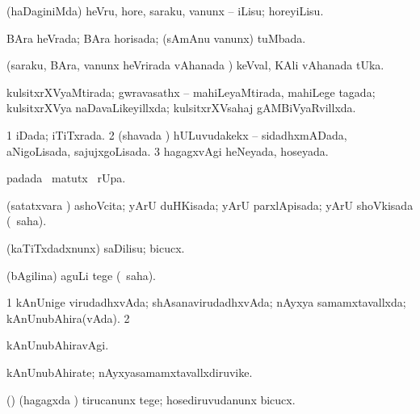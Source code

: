 {{\bentry
{} 
\gl{\sakirx}
\expl{}
\bmng
(haDaginiMda) heVru, hore, saraku, \mo vanunx -- iLisu; horeyiLisu. 
\emng
\eentry

\bentry
{} 
\gl{\gu}
\expl{}
\bmng
BAra heVrada; BAra horisada; (sAmAnu \mo vanunx) tuMbada. 
\emng

\noindent
\gl{\pagu}
\expl{}
\bmng
{} (saraku, BAra, \mo vanunx heVrirada vAhanada \vi) keVval, KAli vAhanada tUka. 
\emng
\eentry

\bentry
{} 
\gl{\gu}
\expl{}
\bmng
kulsitxrXVyaMtirada; gwravasathx -- mahiLeyaMtirada, mahiLege tagada; kulsitxrXVya naDavaLikeyillxda; kulsitxrXVsahaj gAMBiVyaRvillxda. 
\emng
\eentry

\bentry
{} 
\gl{\gu}
\expl{}
\bmng
\bnum
\num{1} iDada; iTiTxrada. 
\num{2} (shavada \vi) hULuvudakekx -- sidadhxmADada, aNigoLisada, sajujxgoLisada. 
\num{3} hagagxvAgi heNeyada, hoseyada. 
\enum
\emng
\eentry

\bentry
{} 
\gl{\kirx}
\expl{}
\bmng
{} padada \BU\ matutx \BUkaq\ rUpa. 
\emng
\eentry

\bentry
{} 
\gl{\gu}
\expl{}
\bmng
(satatxvara \vi) ashoVcita; yArU duHKisada; yArU parxlApisada; yArU shoVkisada (\rUpa\ saha). 
\emng
\eentry

\bentry
{} 
\gl{\akirx}
\expl{}
\bmng
(kaTiTxdadxnunx) saDilisu; bicucx. 
\emng
\eentry

\bentry
{} 
\gl{\akirx}
\expl{}
\bmng
(bAgilina) aguLi tege (\akirx\ saha). 
\emng
\eentry

\bentry
{} 
\gl{\gu}
\expl{}
\bmng
\bnum
\num{1} kAnUnige virudadhxvAda; shAsanavirudadhxvAda; nAyxya samamxtavallxda; kAnUnubAhira(vAda). 
\num{2}  
\enum
\emng
\eentry

\bentry
{} 
\gl{\kirxvi}
\expl{}
\bmng
kAnUnubAhiravAgi. 
\emng
\eentry

\bentry
{} 
\gl{\nA}
\expl{}
\bmng
kAnUnubAhirate; nAyxyasamamxtavallxdiruvike. 
\emng
\eentry

\bentry
{} 
\gl{\sakirx}
\bmng
(\nw) (hagagxda \vi) tirucanunx tege; hosediruvudanunx bicucx. 
\emng
\eentry

}}
